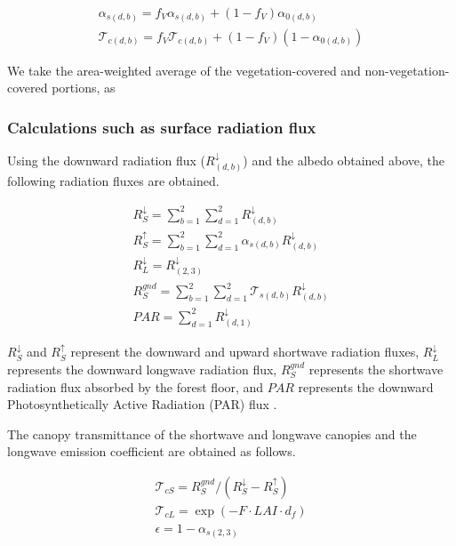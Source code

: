\begin{eqnarray}
  \alpha_{s(d,b)} = f_V \alpha_{s(d,b)}
                       + ( 1 - f_V ) \alpha_{0(d,b)} \\
  {\mathcal{T}}_{c(d,b)} = f_V {\mathcal{T}}_{c(d,b)}
                       + ( 1 - f_V ) ( 1 - \alpha_{0(d,b)} )
\end{eqnarray}

We take the area-weighted average of the vegetation-covered and
non-vegetation-covered portions, as

\hypertarget{calculations-such-as-surface-radiation-flux}{%
\subsubsection{Calculations such as surface radiation
flux}\label{calculations-such-as-surface-radiation-flux}}

Using the downward radiation flux (\(R^{\downarrow}_{(d,b)}\)) and the
albedo obtained above, the following radiation fluxes are obtained.

\begin{eqnarray}
 R^{\downarrow}_S = \sum_{b=1}^2\sum_{d=1}^2 R^{\downarrow}_{(d,b)} \\
 R^{\uparrow}_S = \sum_{b=1}^2\sum_{d=1}^2 \alpha_{s(d,b)} R^{\downarrow}_{(d,b)} \\
 R^{\downarrow}_L = R^{\downarrow}_{(2,3)} \\
 R^{gnd}_S = \sum_{b=1}^2\sum_{d=1}^2 {\mathcal{T}}_{s(d,b)} R^{\downarrow}_{(d,b)} \\
 PAR = \sum_{d=1}^2 R^{\downarrow}_{(d,1)}
\end{eqnarray}

\(R^{\downarrow}_S\) and \(R^{\uparrow}_S\) represent the downward and
upward shortwave radiation fluxes, \(R^{\downarrow}_L\) represents the
downward longwave radiation flux, \(R^{gnd}_S\) represents the shortwave
radiation flux absorbed by the forest floor, and \(PAR\) represents the
downward Photosynthetically Active Radiation (PAR) flux .

The canopy transmittance of the shortwave and longwave canopies and the
longwave emission coefficient are obtained as follows.

\begin{eqnarray}
 {\mathcal{T}}_{cS} = R^{gnd}_S / ( R^{\downarrow}_S - R^{\uparrow}_S ) \\
 {\mathcal{T}}_{cL} = \exp( - F \cdot LAI \cdot d_f ) \\
 \epsilon = 1 - \alpha_{s(2,3)}
\end{eqnarray}

